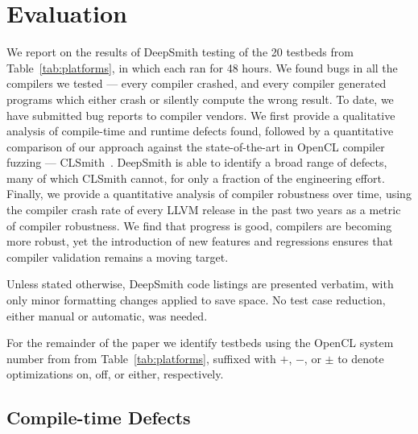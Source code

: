 \section{Evaluation}%
\label{sec:eval}



\noindent
We report on the results of DeepSmith testing of the 20 testbeds from Table~\ref{tab:platforms}, in which each ran for 48 hours. We found bugs in all the compilers we tested --- every compiler crashed, and every compiler generated programs which either crash or silently compute the wrong result. To date, we have submitted  bug reports to compiler vendors. We first provide a qualitative analysis of compile-time and runtime defects found, followed by a quantitative comparison of our approach against the state-of-the-art in OpenCL compiler fuzzing --- CLSmith~\cite{Lidbury2015a}. DeepSmith is able to identify a broad range of defects, many of which CLSmith cannot, for only a fraction of the engineering effort. Finally, we provide a quantitative analysis of compiler robustness over time, using the compiler crash rate of every LLVM release in the past two years as a metric of compiler robustness. We find that progress is good, compilers are becoming more robust, yet the introduction of new features and regressions ensures that compiler validation remains a moving target.


Unless stated otherwise, DeepSmith code listings are presented verbatim, with only minor formatting changes applied to save space. No test case reduction, either manual or automatic, was needed.


For the remainder of the paper we identify testbeds using the OpenCL system number from from Table~\ref{tab:platforms}, suffixed with $+$, $-$, or $\pm$ to denote optimizations on, off, or either, respectively.

\subsection{Compile-time Defects}%
\label{subsec:compile-time-defects}

